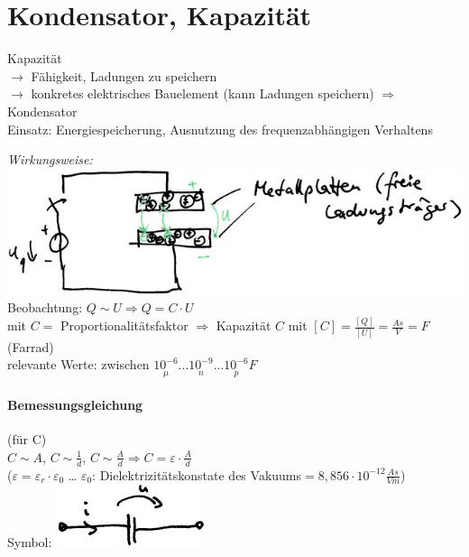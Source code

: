 \section{Kondensator, Kapazität}

Kapazität \\
$\rightarrow$ Fähigkeit, Ladungen zu speichern\\
$\rightarrow$ konkretes elektrisches Bauelement (kann Ladungen speichern) $\Rightarrow$ Kondensator \medskip\\
Einsatz: Energiespeicherung, Ausnutzung des frequenzabhängigen Verhaltens

\emph{Wirkungsweise:}\\
\includegraphics[scale=.75]{Abbildungen/ABB406}\\
Beobachtung: $Q\sim U \Rightarrow Q=C\cdot U$ \\
mit $C = $ Proportionalitätsfaktor $\Rightarrow$ Kapazität $C$ mit $[C]=\frac{[Q]}{[U]}=\frac{As}{V}=F$ (Farrad)\\
relevante Werte: zwischen $\underset{\mu}{10^{-6}}... \underset{n}{10^{-9}}...\underset{p}{10^{-6}}F$
\paragraph{Bemessungsgleichung} (für C)\\
$C \sim A$, $C\sim \frac{1}{d}$, $C\sim  \frac{A}{d} \Rightarrow C=\varepsilon \cdot \frac{A}{d}$ \\
($\varepsilon = \varepsilon_r \cdot \varepsilon_0$ … $\varepsilon_0$: Dielektrizitätskonstate des Vakuums$=8,856\cdot 10^{-12}\frac{As}{Vm}$)\\
Symbol: \includegraphics[scale=.75]{Abbildungen/ABB407}
